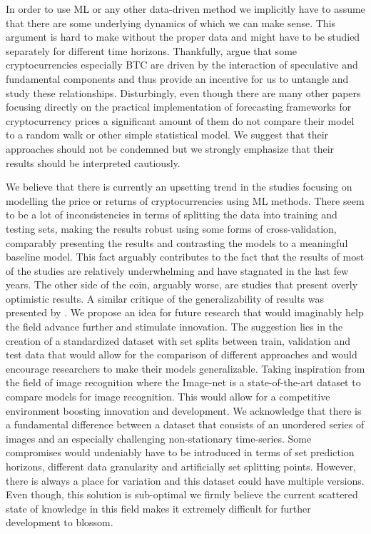 In order to use \ac{ML} or any other data-driven method we implicitly have to 
assume that there are some underlying dynamics of which we can make sense. 
This argument is hard to make without the proper data and might have to be 
studied separately for different time horizons. Thankfully, \cite{Kukacka2023}
argue that some cryptocurrencies especially \ac{BTC} are driven by the interaction of
speculative and fundamental components and thus provide an incentive for us 
to untangle and study these relationships. Disturbingly, even though 
there are many other papers focusing directly on the practical implementation of 
forecasting frameworks for cryptocurrency prices a significant amount of them
do not compare their model to a random walk or other simple statistical model.
We suggest that their approaches should not be condemned but we 
strongly emphasize 
that their results should be interpreted cautiously.

We believe that there is currently an upsetting trend in the studies
focusing on modelling the price or returns of cryptocurrencies using \ac{ML} methods.
There seem to be a lot of inconsistencies in terms of splitting the data
into training and testing sets, making the results robust using some forms 
of cross-validation, comparably presenting the results and 
contrasting the models to a meaningful baseline model. 
This fact arguably contributes to the fact that the results of most of the studies 
are relatively underwhelming and have stagnated in the last few years.
The other side of the coin, arguably worse, are studies that 
present overly optimistic results. A similar critique 
of the generalizability of results was presented by \cite{Akyildirim2020}.
We propose an idea for future research that would imaginably help the field
advance further and stimulate innovation. The suggestion lies in the creation
of a standardized dataset with set splits between train, validation and test data
that would allow for the comparison of different approaches and would
encourage researchers to make their models generalizable. Taking inspiration
from the field of image recognition where the Image-net is a state-of-the-art dataset
to compare models for image recognition. This would allow for a competitive 
environment boosting innovation and development.
We acknowledge that there is a fundamental difference between a dataset
that consists of an unordered series of images and an especially challenging
non-stationary time-series.
Some compromises would undeniably have to be introduced in terms of 
set prediction horizons, different data granularity and artificially set splitting points.
However, there is always a place for variation and this dataset 
could have multiple versions. Even though, this solution is sub-optimal 
we firmly believe the current scattered state of knowledge in this field 
makes it extremely difficult for further development to blossom.


